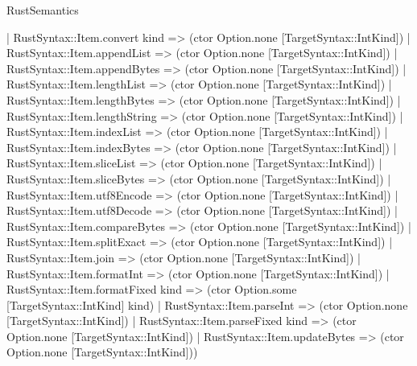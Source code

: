 \begin{lexlean}{RustSemantics}
\begin{semanticmodule}
{    | RustSyntax::Item.convert kind => (ctor Option.none [TargetSyntax::IntKind])
    | RustSyntax::Item.appendList => (ctor Option.none [TargetSyntax::IntKind])
    | RustSyntax::Item.appendBytes => (ctor Option.none [TargetSyntax::IntKind])
    | RustSyntax::Item.lengthList => (ctor Option.none [TargetSyntax::IntKind])
    | RustSyntax::Item.lengthBytes => (ctor Option.none [TargetSyntax::IntKind])
    | RustSyntax::Item.lengthString => (ctor Option.none [TargetSyntax::IntKind])
    | RustSyntax::Item.indexList => (ctor Option.none [TargetSyntax::IntKind])
    | RustSyntax::Item.indexBytes => (ctor Option.none [TargetSyntax::IntKind])
    | RustSyntax::Item.sliceList => (ctor Option.none [TargetSyntax::IntKind])
    | RustSyntax::Item.sliceBytes => (ctor Option.none [TargetSyntax::IntKind])
    | RustSyntax::Item.utf8Encode => (ctor Option.none [TargetSyntax::IntKind])
    | RustSyntax::Item.utf8Decode => (ctor Option.none [TargetSyntax::IntKind])
    | RustSyntax::Item.compareBytes => (ctor Option.none [TargetSyntax::IntKind])
    | RustSyntax::Item.splitExact => (ctor Option.none [TargetSyntax::IntKind])
    | RustSyntax::Item.join => (ctor Option.none [TargetSyntax::IntKind])
    | RustSyntax::Item.formatInt => (ctor Option.none [TargetSyntax::IntKind])
    | RustSyntax::Item.formatFixed kind => (ctor Option.some [TargetSyntax::IntKind] kind)
    | RustSyntax::Item.parseInt => (ctor Option.none [TargetSyntax::IntKind])
    | RustSyntax::Item.parseFixed kind => (ctor Option.none [TargetSyntax::IntKind])
    | RustSyntax::Item.updateBytes => (ctor Option.none [TargetSyntax::IntKind]))
}


\end{semanticmodule}
\end{lexlean}
